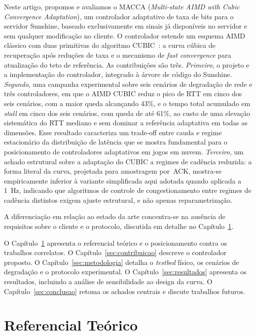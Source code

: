 \documentclass[conference]{IEEEtran}
\begin{document}
Neste artigo, propomos e avaliamos o MACCA (\emph{Multi-state
AIMD with Cubic Convergence Adaptation}), um
controlador adaptativo de taxa de bits para o servidor
Sunshine, baseado exclusivamente em sinais já disponíveis no
servidor e sem qualquer modificação no cliente. O controlador
estende um esquema AIMD clássico com duas primitivas do
algoritmo CUBIC~\cite{cubic}: a curva cúbica de recuperação
após reduções de taxa e o mecanismo de \emph{fast convergence}
para atualização do teto de referência. As contribuições são
três. \emph{Primeiro}, o projeto e a implementação do
controlador, integrado à árvore de código do Sunshine.
\emph{Segundo}, uma campanha experimental sobre seis cenários
de degradação de rede e três controladores, em que o AIMD
CUBIC reduz o pico de RTT em cinco dos seis cenários, com a
maior queda alcançando 43\%, e o tempo total acumulado em
\emph{stall} em cinco dos seis cenários, com queda de até
61\%, ao custo de uma elevação sistemática do RTT mediano e
sem dominar a referência adaptativa em todas as dimensões.
Esse resultado caracteriza um trade-off entre cauda e regime
estacionário da distribuição de latência que se mostra
fundamental para o posicionamento de controladores
adaptativos em jogos em nuvem. \emph{Terceiro}, um achado
estrutural sobre a adaptação do CUBIC a regimes de cadência
reduzida: a forma literal da curva, projetada para amostragem
por~ACK, mostra-se empiricamente inferior à variante
simplificada aqui adotada quando aplicada a 1~Hz, indicando
que algoritmos de controle de congestionamento entre regimes
de cadência distintos exigem ajuste estrutural, e não apenas
reparametrização.

A diferenciação em relação ao estado da arte concentra-se na
ausência de requisitos sobre o cliente e o protocolo,
discutida em detalhe no Capítulo~\ref{sec:referencial}.

O Capítulo~\ref{sec:referencial} apresenta o referencial
teórico e o posicionamento contra os trabalhos correlatos. O
Capítulo~\ref{sec:contribuicao} descreve o controlador
proposto. O Capítulo~\ref{sec:metodologia} detalha o
\emph{testbed} físico, os cenários de degradação e o
protocolo experimental. O Capítulo~\ref{sec:resultados}
apresenta os resultados, incluindo a análise de sensibilidade
ao design da curva. O Capítulo~\ref{sec:conclusao} retoma os
achados centrais e discute trabalhos futuros.


\section{Referencial Teórico}\label{sec:referencial}
\end{document}
